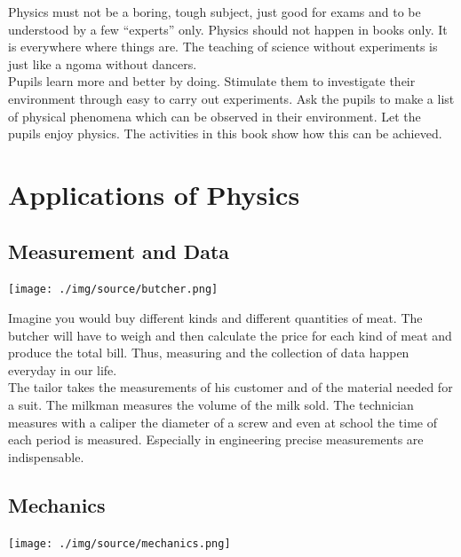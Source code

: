 \begin{multicols}{2}
Physics must not be a boring, tough subject, just good for exams and to be understood by a
few ``experts'' only. Physics should not happen in books only. It is everywhere where things
are. The teaching of science without experiments is just like a ngoma without dancers.\\

Pupils learn more and better by doing. Stimulate them to investigate their environment
through easy to carry out experiments. Ask the pupils to make a list of physical phenomena
which can be observed in their environment. Let the pupils enjoy physics. The activities in this book
show how this can be achieved.

\vfill
\columnbreak



\section*{Applications of Physics}


\subsection{Measurement and Data}

\begin{center}
\texttt{[image: ./img/source/butcher.png]}
\end{center}

Imagine you would buy different kinds and different quantities of meat. The butcher will have
to weigh and then calculate the price for each kind of meat and produce the total bill. Thus,
measuring and the collection of data happen everyday in our life.\\

The tailor takes the measurements of his customer and of the material needed for a suit. The
milkman measures the volume of the milk sold. The technician measures with a caliper the
diameter of a screw and even at school the time of each period is measured. Especially in
engineering precise measurements are indispensable.

\vfill
\columnbreak

\subsection{Mechanics}

\begin{center}
\texttt{[image: ./img/source/mechanics.png]}
\end{center}


\end{multicols}
